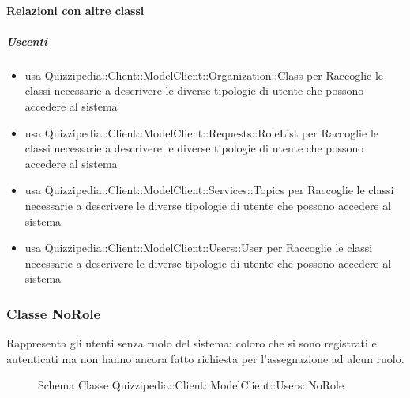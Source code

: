 \paragraph{Relazioni con altre classi}
\subparagraph{Uscenti}
\begin{itemize}
\item usa Quizzipedia::Client::ModelClient::Organization::Class per Raccoglie le classi necessarie a descrivere le diverse tipologie di utente che possono accedere al sistema
\item usa Quizzipedia::Client::ModelClient::Requests::RoleList per Raccoglie le classi necessarie a descrivere le diverse tipologie di utente che possono accedere al sistema
\item usa Quizzipedia::Client::ModelClient::Services::Topics per Raccoglie le classi necessarie a descrivere le diverse tipologie di utente che possono accedere al sistema
\item usa Quizzipedia::Client::ModelClient::Users::User per Raccoglie le classi necessarie a descrivere le diverse tipologie di utente che possono accedere al sistema
\end{itemize}
\subsubsection{Classe NoRole}
Rappresenta gli utenti senza ruolo del sistema; coloro che si sono registrati e autenticati ma non hanno ancora fatto richiesta per l'assegnazione ad alcun ruolo.
\begin{figure}[H]
\centering
\noindent{}
\caption[Schema Classe NoRole]{Schema Classe Quizzipedia::Client::ModelClient::Users::NoRole}
\end{figure}
